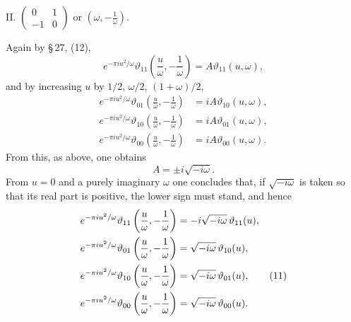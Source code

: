 \documentclass[11pt]{article}
\providecommand{\tht}{\vartheta}
\begin{document}
II. $\begin{pmatrix}0&1\\-1&0\end{pmatrix}$ or $\left(\omega,-\frac1\omega\right)$.

Again by \S\,27, (12),
\begin{equation}
e^{-\pi i u^2/\omega}\tht_{11}\left(\frac{u}{\omega},-\frac1\omega\right)
=A\tht_{11}(u,\omega), \tag{7}
\end{equation}
and by increasing $u$ by $1/2$, $\omega/2$, $(1+
\omega)/2$,
\begin{align}
e^{-\pi i u^2/\omega}\tht_{01}\left(\frac{u}{\omega},-\frac1\omega\right)&=iA\tht_{10}(u,\omega), \tag{8}\\
e^{-\pi i u^2/\omega}\tht_{10}\left(\frac{u}{\omega},-\frac1\omega\right)&=iA\tht_{01}(u,\omega), \tag{9}\\
e^{-\pi i u^2/\omega}\tht_{00}\left(\frac{u}{\omega},-\frac1\omega\right)&=iA\tht_{00}(u,\omega). \tag{10}
\end{align}
From this, as above, one obtains
\[
A=\pm i\sqrt{-i\omega}.
\]
From $u=0$ and a purely imaginary $\omega$ one concludes that, if $\sqrt{-i\omega}$ is taken so that its real part is positive, the lower sign must stand, and hence
\begin{align}
e^{-\pi i u^2/\omega}\tht_{11}\left(\frac{u}{\omega},-\frac1\omega\right)&=-i\sqrt{-i\omega}\,\tht_{11}(u),\notag\\
e^{-\pi i u^2/\omega}\tht_{01}\left(\frac{u}{\omega},-\frac1\omega\right)&=\sqrt{-i\omega}\,\tht_{10}(u),\notag\\
e^{-\pi i u^2/\omega}\tht_{10}\left(\frac{u}{\omega},-\frac1\omega\right)&=\sqrt{-i\omega}\,\tht_{01}(u), \tag{11}\\
e^{-\pi i u^2/\omega}\tht_{00}\left(\frac{u}{\omega},-\frac1\omega\right)&=\sqrt{-i\omega}\,\tht_{00}(u).\notag
\end{align}
\end{document}
